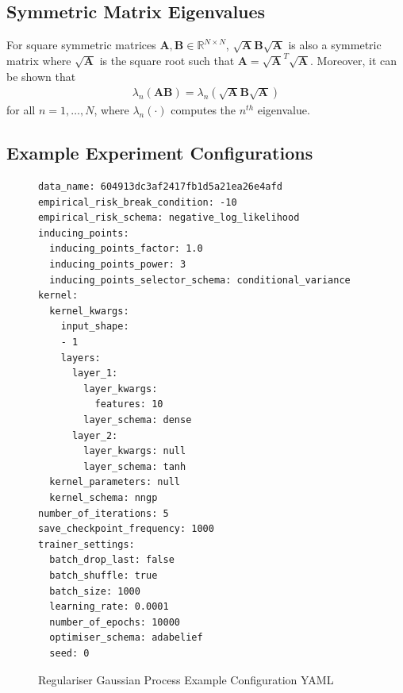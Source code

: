 \documentclass{article}
\numberwithin{equation}{section}
\begin{document}
\newpage
\subsection{Symmetric Matrix Eigenvalues}\label{appendix:eigenvalue-symmetric-matrix}
For square symmetric matrices $\mathbf{A}, \mathbf{B} \in \mathbb{R}^{N \times N}$, $\sqrt{\mathbf{A}}\mathbf{B}\sqrt{\mathbf{A}}$ is also a symmetric matrix where $\sqrt{\mathbf{A}}$ is the square root such that $\mathbf{A} = \sqrt{\mathbf{A}}^T \sqrt{\mathbf{A}}$. Moreover, it can be shown that
\begin{align}
    \lambda_{n} \left(\mathbf{A} \mathbf{B}\right) = \lambda_{n} \left(\sqrt{\mathbf{A}}\mathbf{B}\sqrt{\mathbf{A}}\right)
\end{align}
for all $n=1,\dots,N$, where $\lambda_{n}(\cdot)$ computes the $n^{th}$ eigenvalue.

\newpage
\subsection{Example Experiment Configurations}\label{appendix:configuration-yamls}
\begin{figure}[!h]
\begin{lstlisting}[style=yaml]
data_name: 604913dc3af2417fb1d5a21ea26e4afd
empirical_risk_break_condition: -10
empirical_risk_schema: negative_log_likelihood
inducing_points:
  inducing_points_factor: 1.0
  inducing_points_power: 3
  inducing_points_selector_schema: conditional_variance
kernel:
  kernel_kwargs:
    input_shape:
    - 1
    layers:
      layer_1:
        layer_kwargs:
          features: 10
        layer_schema: dense
      layer_2:
        layer_kwargs: null
        layer_schema: tanh
  kernel_parameters: null
  kernel_schema: nngp
number_of_iterations: 5
save_checkpoint_frequency: 1000
trainer_settings:
  batch_drop_last: false
  batch_shuffle: true
  batch_size: 1000
  learning_rate: 0.0001
  number_of_epochs: 10000
  optimiser_schema: adabelief
  seed: 0
\end{lstlisting}
\caption{Regulariser Gaussian Process Example Configuration YAML}
\end{figure}
\end{document}

